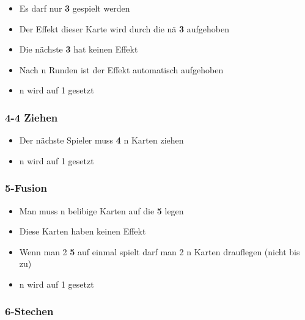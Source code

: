 \documentclass[10pt,a4paper]{article}
\begin{document}
\begin{itemize}
\item
  Es darf nur \textbf{3} gespielt werden
\item
  Der Effekt dieser Karte wird durch die nä \textbf{3} aufgehoben
\item
  Die nächste \textbf{3} hat keinen Effekt
\item
  Nach n Runden ist der Effekt automatisch aufgehoben
\item
  n wird auf 1 gesetzt
\end{itemize}

\subsubsection{4-4 Ziehen}\label{ziehen}

\begin{itemize}
\item
  Der nächste Spieler muss \textbf{4} n Karten ziehen
\item
  n wird auf 1 gesetzt
\end{itemize}

\subsubsection{5-Fusion}\label{fusion}

\begin{itemize}
\item
  Man muss n belibige Karten auf die \textbf{5} legen
\item
  Diese Karten haben keinen Effekt
\item
  Wenn man 2 \textbf{5} auf einmal spielt darf man 2 n Karten drauflegen
  (nicht bis zu)
\item
  n wird auf 1 gesetzt
\end{itemize}

\subsubsection{6-Stechen}\label{stechen}
\end{document}
